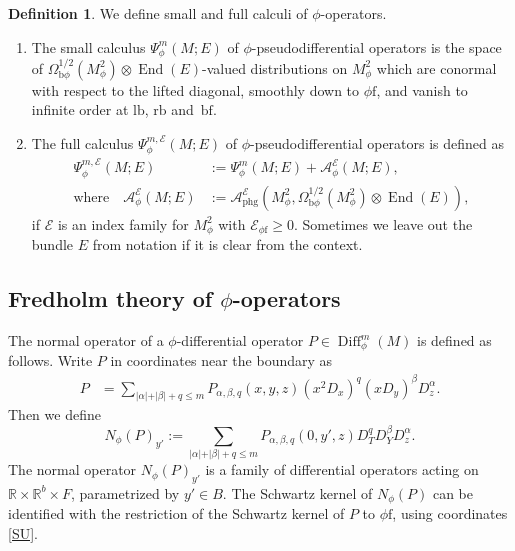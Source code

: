 \documentclass[JEP,XML,SOM,Unicode,NoFloatCountersInSection,published]{cedram}
\newcommand{\bphi}{{\bb\phi}}
\theoremstyle{plain}
\theoremstyle{definition}
\newtheorem{defn}[Th]{Definition}
\newcommand\calA{{\mathcal A}}
\newcommand\calE{{\mathcal E}}
\newcommand {\phg}{{\mathrm{phg}}}
\newcommand{\phif}{{\phi\mathrm{f}}}
\newcommand{\lf}{{\mathrm{lb}}}
\newcommand{\rf}{{\mathrm{rb}}}
\newcommand{\bb}{{\mathrm{b}}}
\newcommand{\bbf}{{\mathrm{bf}}}
\DeclareMathOperator{\Diff}{Diff}
\DeclareMathOperator{\End}{End}
\begin{document}
\begin{defn}\label{phi-calculus-basic} We define small and full calculi of $\phi$-operators.
\begin{enumerate}
\item
The small calculus $\Psi_\phi^m(M; E)$ of $\phi$-pseudodifferential operators is the
space of $\Omega^{1/2}_{\bphi}(M^2_\phi) \otimes \End(E)$-valued
distributions on $M^2_\phi$ which are conormal with
respect to the lifted diagonal, smoothly down to $\phif$, and vanish to infinite order at $\lf$, $\rf$ and~$\bbf$.
\item
The full calculus $\Psi_\phi^{m,\calE}(M; E)$ of $\phi$-pseudodifferential operators is defined as
\begin{align*}
\Psi_\phi^{m,\calE}(M; E) &:= \Psi_\phi^{m}(M; E) + \calA_{\phi}^\calE(M;E), \\
\text{where} \quad \calA_{\phi}^\calE(M;E)&:= \calA_{\phg}^\calE(M^2_\phi,
\Omega^{1/2}_{\bphi}(M^2_\phi) \otimes \End(E)),
\end{align*}
if $\calE$ is an index family for $M^2_\phi$ with $\calE_{\phif}\geq 0$.
Sometimes we leave out the bundle $E$ from notation if it is clear from the context.
\end{enumerate}
\end{defn}

\subsection{Fredholm theory of \texorpdfstring{$\phi$}{phi}-operators}\label{normal op}
The normal operator of a $\phi$-differential operator
$P \in \Diff_{\phi}^{m}(M)$ is defined as follows. Write $P$ in coordinates near the boundary as
\begin{align*}
P &= \sum_{\vert \alpha \vert + \vert \beta \vert + q \leq m}
P_{\alpha,\beta,q}(x,y,z)(x^{2}D_{x})^{q}(xD_{y})^\beta D_{z}^{\alpha}.
\end{align*}
Then we define
\begin{equation}
\label{eqn:normal family def}
N_{\phi}(P)_{y'} :=
\sum_{\vert \alpha \vert + \vert \beta \vert + q \leq m}
P_{\alpha,\beta,q}(0,y',z) D^q_T D^\beta_Y D_{z}^{\alpha}.
\end{equation}
The normal operator $N_{\phi}(P)_{y'}$ is a family of differential operators acting on
$\mathbb{R}\times\mathbb{R}^{b}\times F$, parametrized by $y'\in B$. The Schwartz kernel of $N_\phi(P)$ can be identified with the restriction of the Schwartz kernel of $P$ to $\phif$, using coordinates \eqref{SU}.
\end{document}

